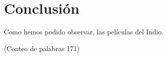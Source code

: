 \section{Conclusión}
Como hemos podido observar, las películas del Indio. 

(Conteo de palabras 171)
